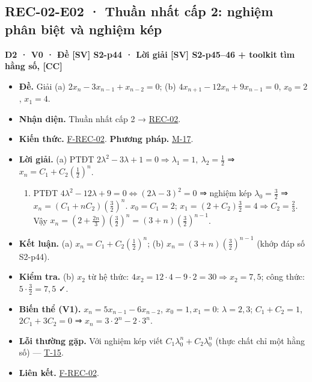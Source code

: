 \documentclass[
  10pt,
  twoside,openany]{book}
\providecommand{\tightlist}{%
  \setlength{\itemsep}{0pt}\setlength{\parskip}{0pt}}
\begin{document}
\hypertarget{REC-02-E02}{%
\subsection{REC-02-E02 · Thuần nhất cấp 2: nghiệm phân biệt và nghiệm
kép}\label{REC-02-E02}}

\textbf{D2 · V0 · Đề {[}SV{]} S2-p44 · Lời giải {[}SV{]} S2-p45--46 +
toolkit tìm hằng số, {[}CC{]}}

\begin{itemize}
\tightlist
\item
  \textbf{Đề.} Giải (a) \(2x_n-3x_{n-1}+x_{n-2}=0\); (b)
  \(4x_{n+1}-12x_n+9x_{n-1}=0\), \(x_0=2\), \(x_1=4\).
\item
  \textbf{Nhận diện.} Thuần nhất cấp 2 →
  \protect\hyperlink{REC-02}{REC-02}.
\item
  \textbf{Kiến thức.} \protect\hyperlink{F-REC-02}{F-REC-02}.
  \textbf{Phương pháp.} \protect\hyperlink{M-17}{M-17}.
\item
  \textbf{Lời giải.} (a) PTĐT
  \(2\lambda^2-3\lambda+1=0\Rightarrow\lambda_1=1,\ \lambda_2=\frac12\)
  ⇒ \(x_n=C_1+C_2\left(\frac12\right)^n\).

  \begin{enumerate}
  \def\labelenumi{(\alph{enumi})}
  \setcounter{enumi}{1}
  \tightlist
  \item
    PTĐT \(4\lambda^2-12\lambda+9=0\Leftrightarrow(2\lambda-3)^2=0\) ⇒
    nghiệm kép \(\lambda_0=\frac32\) ⇒
    \(x_n=(C_1+nC_2)\left(\frac32\right)^n\). \(x_0=C_1=2\);
    \(x_1=(2+C_2)\frac32=4\Rightarrow C_2=\frac23\). Vậy
    \(x_n=\left(2+\frac{2n}{3}\right)\left(\frac32\right)^n=(3+n)\left(\frac32\right)^{n-1}\).
  \end{enumerate}
\item
  \textbf{Kết luận.} (a) \(x_n=C_1+C_2\left(\frac12\right)^n\); (b)
  \(x_n=(3+n)\left(\frac32\right)^{n-1}\) (khớp đáp số S2-p44).
\item
  \textbf{Kiểm tra.} (b) \(x_2\) từ hệ thức:
  \(4x_2=12\cdot4-9\cdot2=30\Rightarrow x_2=7{,}5\); công thức:
  \(5\cdot\frac32=7{,}5\) ✓.
\item
  \textbf{Biến thể (V1).} \(x_n=5x_{n-1}-6x_{n-2}\), \(x_0=1,x_1=0\):
  \(\lambda=2,3\); \(C_1+C_2=1\), \(2C_1+3C_2=0\) ⇒
  \(x_n=3\cdot2^n-2\cdot3^n\).
\item
  \textbf{Lỗi thường gặp.} Với nghiệm kép viết
  \(C_1\lambda_0^n+C_2\lambda_0^n\) (thực chất chỉ một hằng số) ---
  \protect\hyperlink{T-15}{T-15}.
\item
  \textbf{Liên kết.} \protect\hyperlink{F-REC-02}{F-REC-02}.
\end{itemize}
\end{document}
